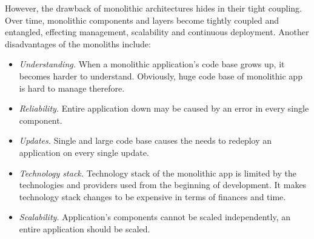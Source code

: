 However, the drawback of monolithic architectures hides in their tight coupling.
Over time, monolithic components and layers become tightly coupled and entangled, effecting management, scalability
and continuous deployment.
Another disadvantages of the monoliths include:
\begin{itemize}
    \item \textit{Understanding.} When a monolithic application's code base grows up,
    it becomes harder to understand.
    Obviously, huge code base of monolithic app is hard to manage therefore.
    \item \textit{Reliability.} Entire application down may be caused by an error in every single component.
    \item \textit{Updates.} Single and large code base causes the needs to redeploy an application on every single update.
    \item \textit{Technology stack.} Technology stack of the monolithic app is limited by the technologies and providers
    used from the beginning of development.
    It makes technology stack changes to be expensive in terms of finances and time.
    \item \textit{Scalability.} Application's components cannot be scaled independently, an entire application should be scaled.
\end{itemize}

